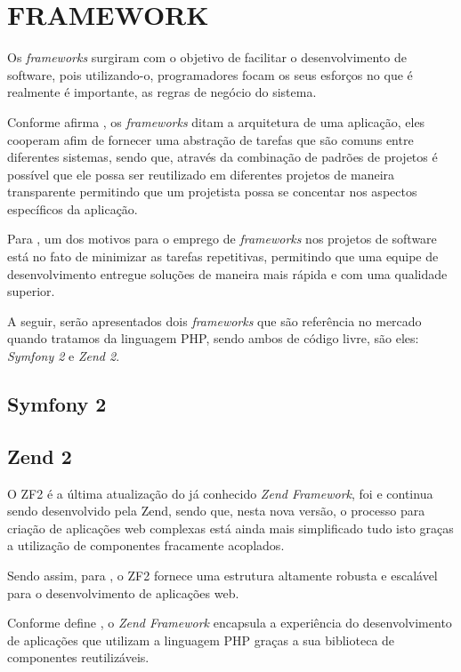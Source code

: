 \section{FRAMEWORK}

Os \textit{frameworks} surgiram com o objetivo de facilitar o desenvolvimento de
software, pois utilizando-o, programadores focam os seus esforços no que é
realmente é importante, as regras de negócio do sistema.

Conforme afirma , os
\textit{frameworks} ditam a arquitetura de uma aplicação, eles cooperam afim de fornecer 
uma abstração de tarefas que são comuns entre diferentes sistemas, sendo que, 
através da combinação de padrões de projetos é possível que ele possa ser 
reutilizado em diferentes projetos de maneira transparente permitindo que um 
projetista possa se concentar nos aspectos específicos da aplicação.

Para , um dos motivos para o 
emprego de \textit{frameworks} nos projetos de software está no fato de minimizar as 
tarefas repetitivas, permitindo que uma equipe de desenvolvimento entregue 
soluções de maneira mais rápida e com uma qualidade superior.

A seguir, serão apresentados dois \textit{frameworks} que são referência no mercado
quando tratamos da linguagem \acs{PHP}, sendo ambos de código livre, são
eles: \textit{Symfony 2} e \textit{Zend 2}.

\subsection{Symfony 2}


\subsection{Zend 2}

O \ac{ZF2} é a última atualização do já conhecido \textit{Zend
Framework}, foi e continua sendo desenvolvido pela \acs{Zend}, sendo que, nesta
nova versão, o processo para criação de aplicações web complexas está ainda mais
simplificado tudo isto graças a utilização de componentes fracamente acoplados.

Sendo assim, para , o
\acs{ZF2} fornece uma estrutura altamente robusta e escalável para o 
desenvolvimento de aplicações web.

Conforme define
, o 
\textit{Zend Framework} encapsula a experiência do desenvolvimento de aplicações
que utilizam a linguagem \acs{PHP} graças a sua biblioteca de componentes reutilizáveis.

